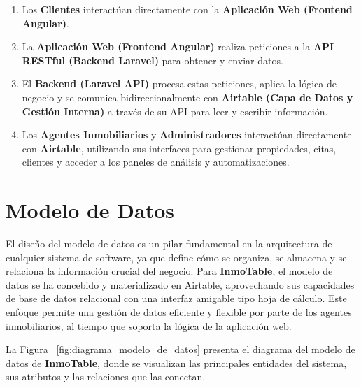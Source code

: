 \begin{enumerate}
    \item Los \textbf{Clientes} interactúan directamente con la \textbf{Aplicación Web (Frontend Angular)}.
    
    \item La \textbf{Aplicación Web (Frontend Angular)} realiza peticiones a la \textbf{API RESTful (Backend Laravel)} para obtener y enviar datos.
    
    \item El \textbf{Backend (Laravel API)} procesa estas peticiones, aplica la lógica de negocio y se comunica bidireccionalmente con \textbf{Airtable (Capa de Datos y Gestión Interna)} a través de su API para leer y escribir información.
    
    \item Los \textbf{Agentes Inmobiliarios} y \textbf{Administradores} interactúan directamente con \textbf{Airtable}, utilizando sus interfaces para gestionar propiedades, citas, clientes y acceder a los paneles de análisis y automatizaciones.
\end{enumerate}


\section{Modelo de Datos}


El diseño del modelo de datos es un pilar fundamental en la arquitectura de cualquier sistema de software, ya que define cómo se organiza, se almacena y se relaciona la información crucial del negocio. Para \textbf{InmoTable}, el modelo de datos se ha concebido y materializado en Airtable, aprovechando sus capacidades de base de datos relacional con una interfaz amigable tipo hoja de cálculo. Este enfoque permite una gestión de datos eficiente y flexible por parte de los agentes inmobiliarios, al tiempo que soporta la lógica de la aplicación web.

La Figura ~\ref{fig:diagrama_modelo_de_datos} presenta el diagrama del modelo de datos de \textbf{InmoTable}, donde se visualizan las principales entidades del sistema, sus atributos y las relaciones que las conectan.

